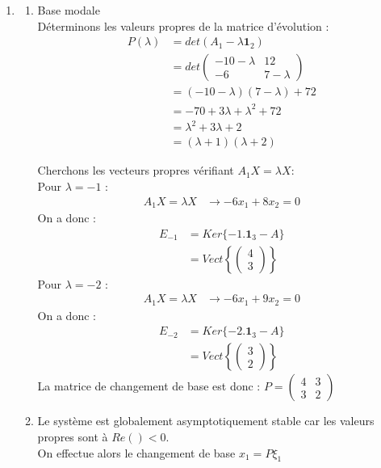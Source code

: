 \documentclass[../main.tex]{subfiles}
\begin{document}
\begin{enumerate}
\item
\begin{enumerate}
\item Base modale \\
Déterminons les valeurs propres de la matrice d'évolution :\\
\begin{align*}
P(\lambda) &= det(A_1 - \lambda \mathbf{1}_2)\\
&= det \begin{pmatrix}-10-\lambda & 12 \\ -6 & 7 - \lambda \end{pmatrix}\\
&= (-10-\lambda)(7-\lambda)+72\\
&= -70 + 3\lambda + \lambda^2 +72\\
&= \lambda^2 +  3 \lambda +2\\
&= (\lambda + 1 )(\lambda + 2)
\end{align*}


Cherchons les vecteurs propres vérifiant $A_1X = \lambda X$:\\
Pour $\lambda = -1$ :
\begin{align*}
A_1X = \lambda X  &\rightarrow -6x_1 + 8x_2 =0
\end{align*}
On a donc :
\begin{align*}
E_{-1} &= Ker\{ -1. \mathbf{1}_3 - A\} \\
&= Vect\left \{ \begin{pmatrix}
4\\3
\end{pmatrix}\right \}
\end{align*}
\bigbreak
Pour $\lambda = -2$ :
\begin{align*}
A_1X = \lambda X  &\rightarrow -6x_1 + 9x_2 =0
\end{align*}
On a donc :
\begin{align*}
E_{-2} &= Ker\{ -2. \mathbf{1}_3 - A\} \\
&= Vect\left \{ \begin{pmatrix}
3\\2
\end{pmatrix}\right \}
\end{align*}
\bigbreak
La matrice de changement de base est donc : $P = \begin{pmatrix}4&3\\3&2\end{pmatrix}$\\
\item Le système est globalement asymptotiquement stable car les valeurs propres sont à $Re() < 0$.\\
On effectue alors le changement de base $x_1 = P \xi_1$


\end{enumerate}
\end{enumerate}
\end{document}
